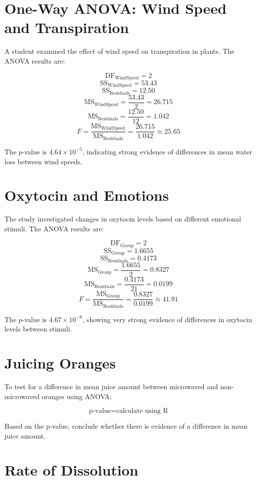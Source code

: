 \documentclass{article}
\begin{document}
\section{One-Way ANOVA: Wind Speed and Transpiration}

A student examined the effect of wind speed on transpiration in plants. The ANOVA results are:

\[
\text{DF}_{\text{WindSpeed}} = 2
\]
\[
\text{SS}_{\text{WindSpeed}} = 53.43
\]
\[
\text{SS}_{\text{Residuals}} = 12.50
\]
\[
\text{MS}_{\text{WindSpeed}} = \frac{53.43}{2} = 26.715
\]
\[
\text{MS}_{\text{Residuals}} = \frac{12.50}{12} = 1.042
\]
\[
F = \frac{\text{MS}_{\text{WindSpeed}}}{\text{MS}_{\text{Residuals}}} = \frac{26.715}{1.042} \approx 25.65
\]

The \( p \)-value is \( 4.64 \times 10^{-5} \), indicating strong evidence of differences in mean water loss between wind speeds.

\section{Oxytocin and Emotions}

The study investigated changes in oxytocin levels based on different emotional stimuli. The ANOVA results are:

\[
\text{DF}_{\text{Group}} = 2
\]
\[
\text{SS}_{\text{Group}} = 1.6655
\]
\[
\text{SS}_{\text{Residuals}} = 0.4173
\]
\[
\text{MS}_{\text{Group}} = \frac{1.6655}{2} = 0.8327
\]
\[
\text{MS}_{\text{Residuals}} = \frac{0.4173}{21} = 0.0199
\]
\[
F = \frac{\text{MS}_{\text{Group}}}{\text{MS}_{\text{Residuals}}} = \frac{0.8327}{0.0199} \approx 41.91
\]

The \( p \)-value is \( 4.67 \times 10^{-8} \), showing very strong evidence of differences in oxytocin levels between stimuli.

\section{Juicing Oranges}

To test for a difference in mean juice amount between microwaved and non-microwaved oranges using ANOVA:

\[
\text{p-value} = \text{calculate using R}
\]

Based on the p-value, conclude whether there is evidence of a difference in mean juice amount.

\section{Rate of Dissolution}
\end{document}
